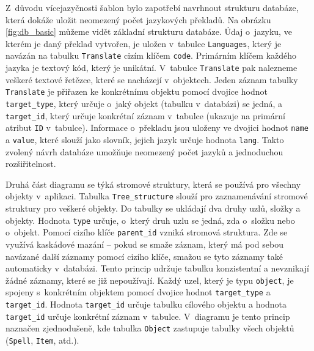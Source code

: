 \documentclass[thesis=B,czech]{resources/FITthesis}[2012/06/26]
\begin{document}
Z~důvodu vícejazyčnosti šablon bylo zapotřebí navrhnout strukturu databáze, která dokáže uložit neomezený počet jazykových překladů. Na obrázku \ref{fig:db_basic} můžeme vidět základní strukturu databáze. Údaj o~jazyku, ve kterém je daný překlad vytvořen, je uložen v~tabulce \texttt{Languages}, který je navázán na tabulku \texttt{Translate} cizím klíčem \texttt{code}. Primárním klíčem každého jazyka je textový kód, který je unikátní. V~tabulce \texttt{Translate} pak nalezneme veškeré textové řetězce, které se nacházejí v~objektech. Jeden záznam tabulky \texttt{Translate} je přiřazen ke konkrétnímu objektu pomocí dvojice hodnot \texttt{target\_type}, který určuje o~jaký objekt (tabulku v~databázi) se jedná, a \texttt{target\_id}, který určuje konkrétní záznam v~tabulce (ukazuje na primární atribut \texttt{ID} v~tabulce). Informace o~překladu jsou uloženy ve dvojici hodnot \texttt{name} a \texttt{value}, které slouží jako slovník, jejich jazyk určuje hodnota \texttt{lang}. Takto zvolený návrh databáze umožňuje neomezený počet jazyků a jednoduchou rozšiřitelnost.\par

Druhá část diagramu se týká stromové struktury, která se používá pro všechny objekty v~aplikaci. Tabulka \texttt{Tree\_structure} slouží pro zaznamenávání stromové struktury pro veškeré objekty. Do tabulky se ukládají dva druhy uzlů, složky a objekty. Hodnota \texttt{type} určuje, o~který druh uzlu se jedná, zda o~složku nebo o~objekt. Pomocí cizího klíče \texttt{parent\_id} vzniká stromová struktura. Zde se využívá kaskádové mazání -- pokud se smaže záznam, který má pod sebou navázané další záznamy pomocí cizího klíče, smažou se tyto záznamy také automaticky v~databázi. Tento princip udržuje tabulku konzistentní a nevznikají žádné záznamy, které se již nepoužívají. Každý uzel, který je typu \texttt{object}, je spojeny s~konkrétním objektem pomocí dvojice hodnot \texttt{target\_type} a \texttt{target\_id}. Hodnota \texttt{target\_id} určuje tabulku cílového objektu a hodnota \texttt{target\_id} určuje konkrétní záznam v~tabulce. V~diagramu je tento princip naznačen zjednodušeně, kde tabulka \texttt{Object} zastupuje tabulky všech objektů (\texttt{Spell}, \texttt{Item}, atd.). \par
\end{document}
